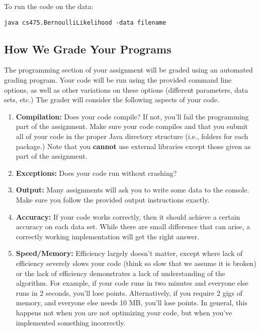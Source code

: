 \documentclass[11pt]{article}
\begin{document}
To run the code on the data:
\begin{footnotesize}
\begin{verbatim}
java cs475.BernoulliLikelihood -data filename
\end{verbatim}
\end{footnotesize}


\subsection{How We Grade Your Programs}
The programming section of your assignment will be graded using an automated grading program. Your code will be run using
the provided command line options, as well as other variations on these options (different parameters, data sets, etc.) The grader will consider the following aspects of your code.
\begin{enumerate}
\item {\bf Compilation:} Does your code compile? If not, you'll fail the programming part of the assignment. Make sure your code compiles and that you submit all of your code in the proper Java directory structure (i.e., folders for each package.) Note that you {\bf cannot} use external libraries except those given as part of the assignment.
\item {\bf Exceptions:} Does your code run without crashing?
\item {\bf Output:} Many assignments will ask you to write some data to the console. Make sure you follow the provided output instructions exactly.
\item {\bf Accuracy:} If your code works correctly, then it should achieve a certain accuracy on each data set. While there are small difference that can arise, a correctly working implementation will get the right answer.
\item {\bf Speed/Memory:} Efficiency largely doesn't matter, except where lack of efficiency severely slows your code (think so slow that we assume it is broken) or the lack of efficiency demonstrates a lack of understanding of the algorithm.  For example, if your code runs in two minutes and everyone else runs in 2 seconds, you'll lose points. Alternatively, if you require 2 gigs of memory, and everyone else needs 10 MB, you'll lose points. In general, this happens not when you are not optimizing your code, but when you've implemented something incorrectly.

\end{enumerate}
\end{document}

